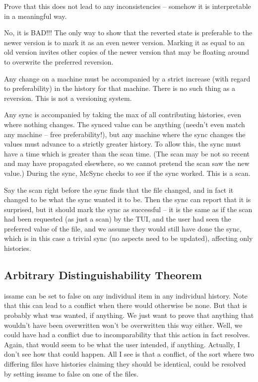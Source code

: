 \documentclass{book}
\begin{document}
Prove that this does not lead to any inconsistencies -- somehow it is interpretable in a meaningful way.

No, it is BAD!!!  The only way to show that the reverted state is preferable to the newer version is to mark it as an even newer version.  Marking it as equal to an old version invites other copies of the newer version that may be floating around to overwrite the preferred reversion.

Any change on a machine must be accompanied by a strict increase (with regard to preferability) in the history for that machine.  There is no such thing as a reversion.  This is not a versioning system.

Any sync is accompanied by taking the max of all contributing histories, even where nothing changes.  The synced value can be anything (needn't even match any machine -- free preferability!), but any machine where the sync changes the values must advance to a strictly greater history.  To allow this, the sync must have a time which is greater than the scan time.  (The scan may be not so recent and may have propagated elsewhere, so we cannot pretend the scan saw the new value.)  During the sync, McSync checks to see if the sync worked.  This is a scan.

Say the scan right before the sync finds that the file changed, and in fact it changed to be what the sync wanted it to be.  Then the sync can report that it is surprised, but it should mark the sync as successful -- it is the same as if the scan had been requested (as just a scan) by the TUI, and the user had seen the preferred value of the file, and we assume they would still have done the sync, which is in this case a trivial sync (no aspects need to be updated), affecting only histories.



\subsection{Arbitrary Distinguishability Theorem}

issame can be set to false on any individual item in any individual history.
Note that this can lead to a conflict when there would otherwise be none.  But that is probably what was wanted, if anything.
We just want to prove that anything that wouldn't have been overwritten won't be overwritten this way either.
Well, we could have had a conflict due to incomparability that this action in fact resolves.  Again, that would seem to be what the user intended, if anything.  Actually, I don't see how that could happen.  All I see is that a conflict, of the sort where two differing files have histories claiming they should be identical, could be resolved by setting issame to false on one of the files.
\end{document}
